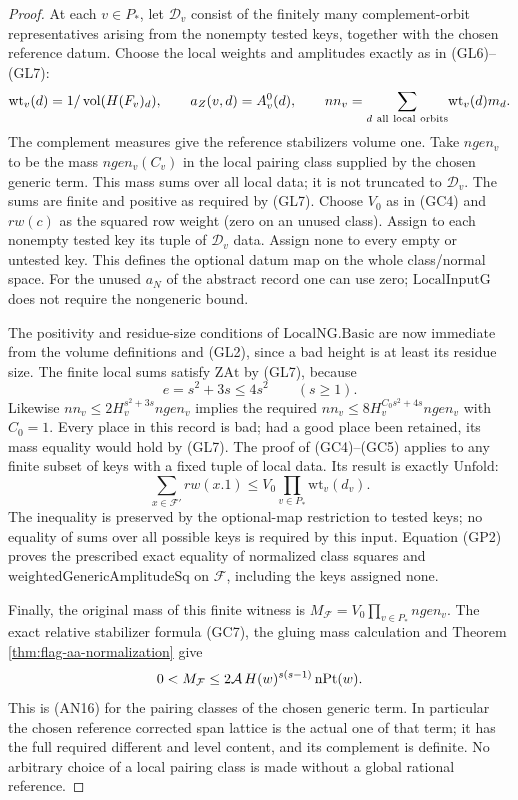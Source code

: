 \begin{proof}
At each \(v\in P_*\), let \(\mathcal D_v\) consist of the
finitely many complement-orbit representatives arising
from the nonempty tested keys, together with the chosen
reference datum. Choose the local weights and amplitudes
exactly as in (GL6)--(GL7):
\[
 \mathrm{wt}_v(d)=1/\operatorname{vol}(H(F_v)_d),\qquad
 a_Z(v,d)=A_v^0(d),\qquad
 nn_v=\sum_{d\ {\rm all\ local\ orbits}}\!
                \mathrm{wt}_v(d)m_d .
\]
The complement measures give the reference stabilizers
volume one. Take \(ngen_v\) to be the mass
\(ngen_v(C_v)\) in the local pairing class supplied
by the chosen generic term. This mass sums over all
local data; it is not truncated to \(\mathcal D_v\).
The sums are finite and positive as required by (GL7).
Choose \(V_0\) as in (GC4) and \(rw(c)\) as the squared
row weight (zero on an unused class). Assign to each
nonempty tested key its tuple of \(\mathcal D_v\) data.
Assign none to every empty or untested key. This defines
the optional datum map on the whole class/normal space.
For the unused \(a_N\) of the abstract record one can
use zero; \(\mathrm{LocalInputG}\) does not require
the nongeneric bound.

The positivity and residue-size conditions of
\(\mathrm{LocalNG.Basic}\) are now immediate from the
volume definitions and (GL2), since a bad height is
at least its residue size. The finite local sums satisfy
\(\mathrm{ZAt}\) by (GL7), because
\[
        e=s^2+3s\le4s^2\qquad(s\ge1).
\]
Likewise \(nn_v\le2H_v^{s^2+3s}ngen_v\)
implies the required
\(nn_v\le8H_v^{C_0s^2+4s}ngen_v\) with \(C_0=1\).
Every place in this record is bad; had a good place
been retained, its mass equality would hold by (GL7).
The proof of (GC4)--(GC5) applies to any finite subset
of keys with a fixed tuple of local data. Its result
is exactly \(\mathrm{Unfold}\):
\[
 \sum_{x\in \mathcal F'} rw(x.1)
          \le V_0\prod_{v\in P_*}\mathrm{wt}_v(d_v).
\]
The inequality is preserved by the optional-map
restriction to tested keys; no equality of sums over
all possible keys is required by this input.
Equation (GP2) proves the prescribed exact equality
of normalized class squares and
\(\mathrm{weightedGenericAmplitudeSq}\) on \(\mathcal F\),
including the keys assigned none.

Finally, the original mass of this finite witness is
\(M_{\mathcal F}=V_0\prod_{v\in P_*}ngen_v\).
The exact relative stabilizer formula (GC7), the
gluing mass calculation and Theorem
\ref{thm:flag-aa-normalization} give
\[
 0<M_{\mathcal F}\le
         2{\cal A}\,H(w)^{s(s-1)}\,\mathrm{nPt}(w).
\]
This is (AN16) for the pairing classes of the chosen
generic term. In particular the chosen reference
corrected span lattice is the actual one of that
term; it has the full required different and level
content, and its complement is definite. No
arbitrary choice of a local pairing class is made
without a global rational reference.


\end{proof}
